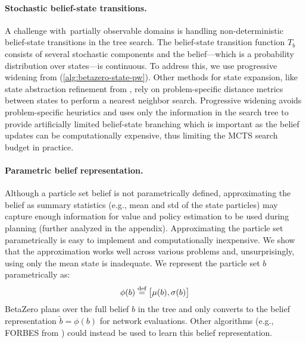 \begin{figure}[t!]
    
\end{figure}


\begin{figure}[b!]
    
\end{figure}

\paragraph{Stochastic belief-state transitions.}
A challenge with~partially observable domains is handling non-deterministic belief-state transitions in the tree search.
The belief-state transition function $T_b$ consists of several stochastic components and the belief---which is a probability distribution over states---is continuous.
To address this, we use progressive widening from \citeauthor{couetoux2011continuous} (\cref{alg:betazero-state-pw}).
Other methods for state expansion, like state abstraction refinement from \citeauthor{sokota2021monte}, rely on problem-specific distance metrics between states to perform a nearest neighbor search.
Progressive widening avoids problem-specific heuristics and uses only the information in the search tree to provide artificially limited belief-state branching which
is important as the belief updates can be computationally expensive, thus limiting the MCTS search budget in practice.


\paragraph{Parametric belief representation.}
Although a particle set belief is not parametrically defined, approximating the belief as summary statistics (e.g., mean and std of the state particles) may capture enough information for value and policy estimation to be used during planning (further analyzed in the appendix).
Approximating the particle set parametrically is easy to implement and computationally inexpensive.
We show that the approximation works well across various problems and, unsurprisingly, using only the mean state is inadequate. 
We represent the particle set $b$ parametrically as:
\begin{equation}
    \phi(b) \stackrel{\text{def}}{=} \big[\mu(b), \sigma(b)\big] \label{eq:belief_rep}
\end{equation}
BetaZero plans over the full belief $b$ in the tree and only converts to the belief representation $\tilde{b} = \phi(b)$ for network evaluations.
Other algorithms (e.g., FORBES from \citeauthor{chen2022flow}) could instead be used to learn this belief representation.

